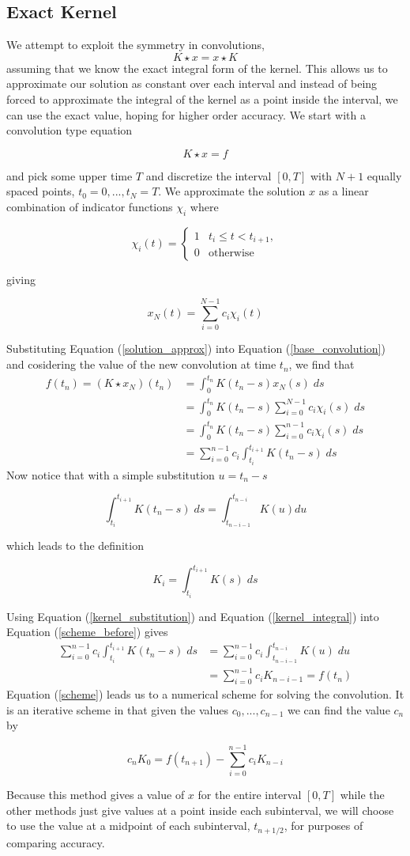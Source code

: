 \documentclass[11pt]{article}
\numberwithin{equation}{section}
\theoremstyle{definition}
\newcommand{\eqn}[2]{
  \begin{equation}
    \label{#1}
    #2
  \end{equation}
}
\newcommand{\eqr}[1]{Equation (\ref{#1})}
\begin{document}
\subsection{Exact Kernel}
We attempt to exploit the symmetry in convolutions, 
$$
  K \star x = x \star K
$$
assuming that we know the exact integral form of the kernel. This allows us to
approximate our solution as constant over each interval and instead of being forced
to approximate the integral of the kernel as a point inside the interval, we can
use the exact value, hoping for higher order accuracy.
We start with a convolution type equation
\eqn{base_convolution}{
  K \star x = f
}
and pick some upper time $T$ and discretize the interval $[0, T]$ with $N+1$
equally spaced points, $t_0 = 0, ..., t_N = T$. We approximate the solution $x$
as a linear combination of indicator functions $\chi_i$ where
\eqn{indicator_defn}{
  \chi_i(t)
  =
  \left\{
  \begin{array}{ll}
    1 & t_{i} \leq t < t_{i+1} , \\
    0 & \text{otherwise}
  \end{array}
  \right.
}
giving
\eqn{solution_approx}{
  x_N(t) = \sum_{i=0}^{N-1} c_i \chi_i(t)
}
Substituting \eqr{solution_approx} into \eqr{base_convolution} and cosidering
the value of the new convolution at time $t_n$, we find that
\begin{align}
\nonumber             f(t_n) = (K \star x_N)(t_n)
                        &= \int_0^{t_n} K(t_n - s)x_N(s)\; ds \\
\nonumber               &= \int_0^{t_n} K(t_n - s) \sum_{i=0}^{N-1} c_i \chi_i(s)\; ds \\
\nonumber               &= \int_0^{t_n} K(t_n - s) \sum_{i=0}^{n-1} c_i \chi_i(s)\; ds \\
\label{scheme_before}   &= \sum_{i=0}^{n-1} c_i \int_{t_i}^{t_{i+1}} K(t_n - s)\; ds
\end{align}
Now notice that with a simple substitution $u = t_n - s$
\eqn{kernel_substitution}{
  \int_{t_i}^{t_{i+1}}K(t_n - s)\; ds = \int_{t_{n-i-1}}^{t_{n-i}} K(u) du
}
which leads to the definition
\eqn{kernel_integral}{
  K_i = \int_{t_i}^{t_{i+1}} K(s)\; ds
}
Using \eqr{kernel_substitution} and \eqr{kernel_integral} into \eqr{scheme_before}
gives
\begin{align}
\nonumber       \sum_{i=0}^{n-1} c_i \int_{t_i}^{t_{i+1}} K(t_n - s)\; ds
                  &= \sum_{i=0}^{n-1} c_i \int_{t_{n-i-1}}^{t_{n-i}} K(u)\; du\\
\label{scheme}    &= \sum_{i=0}^{n-1} c_i K_{n-i-1} = f(t_n)
\end{align}
\eqr{scheme} leads us to a numerical scheme for solving the convolution. It is
an iterative scheme in that given the values $c_0, ..., c_{n-1}$ we can find
the value $c_n$ by
\eqn{specific_term}{
  c_nK_0 = f(t_{n+1}) - \sum_{i=0}^{n-1} c_i K_{n-i}
}
Because this method gives a value of $x$ for the entire interval $[0,T]$ while the
other methods just give values at a point inside each subinterval, we will
choose to use the value at a midpoint of each subinterval, $t_{n+1/2}$, for
purposes of comparing accuracy.
\end{document}

